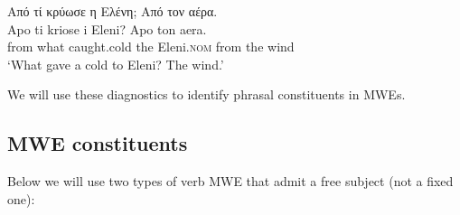 \documentclass[output=paper]{langsci/langscibook}
\begin{document}
\ea%
    \label{ex:7:19}
\glll Από τί κρύωσε η Ελένη; Από τον αέρα. \\
Apo ti kriose i Eleni? Apo ton aera.\\
           from what caught.cold the Eleni.\textsc{nom} from the wind\\
\glt       `What gave a cold to Eleni? The wind.'
\z

We will use these diagnostics to identify phrasal constituents in MWEs. 


\subsection{MWE constituents}

Below we will use two types of verb MWE that admit a free subject (not a fixed one):
\end{document}
